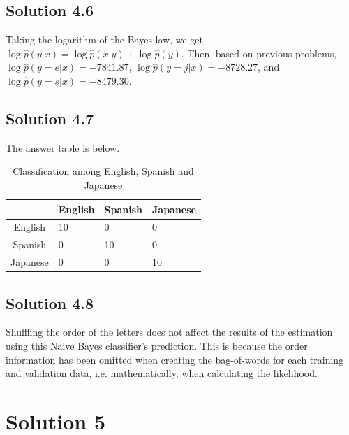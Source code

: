 \documentclass[a4paper]{article}
\theoremstyle{definition}
\newenvironment{soln}{
	\leavevmode\color{blue}\ignorespaces
}{}
\begin{document}
	\subsection*{Solution 4.6}	
	\begin{soln}
	Taking the logarithm of the Bayes law, we get $\log \hat{p}(y|x) = \log \hat{p}(x|y) + \log \hat{p}(y)$. Then, based on previous problems, $\log \hat{p}(y=e|x) = -7841.87$, $\log \hat{p}(y=j|x) = -8728.27$, and $\log \hat{p}(y=s|x) = -8479.30. $
	\end{soln}
	
	\subsection*{Solution 4.7}
	\begin{soln}
	The answer table is below.
	\begin{table}[htbp]
  	\centering
	 \caption{Classification among English, Spanish and Japanese}
  	\begin{tabular}{clll}
  	    & English & Spanish & Japanese \\ 
	   \hline
  	  English & 10 & 0 & 0 \\
  	  Spanish & 0 & 10 & 0 \\ 
	  Japanese & 0 & 0 & 10 \\
 	 \end{tabular}
	\end{table}
	
	\end{soln}
	
	\subsection*{Solution 4.8}
	\begin{soln}	
	Shuffling the order of the letters does not affect the results of the estimation using this Naive Bayes classifier’s prediction. This is because the order information has been omitted when creating the bag-of-words for each training and validation data, i.e. mathematically, when calculating the likelihood.
	\end{soln}
	
	
	\section*{Solution 5}
\end{document}
